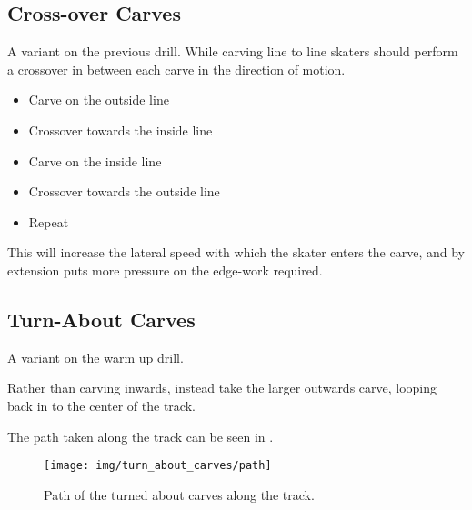 \subsection*{Cross-over Carves}

A variant on the previous drill. 
While carving line to line skaters should perform a crossover in between each carve in the direction of motion.

\begin{itemize}
    \item Carve on the outside line
    \item Crossover towards the inside line 
    \item Carve on the inside line
    \item Crossover towards the outside line
    \item Repeat 
\end{itemize}

This will increase the lateral speed with which the skater enters the carve, and by extension puts more pressure on the edge-work required.      

\subsection*{Turn-About Carves}

A variant on the warm up drill.

Rather than carving inwards, instead take the larger outwards carve, looping back in to the center of the track. 

The path taken along the track can be seen in . 

\begin{figure*}
\centering
\texttt{[image: img/turn\_about\_carves/path]}
\caption{Path of the turned about carves along the track. \label{fig:sticky/carves/turn_about}}
\end{figure*}

